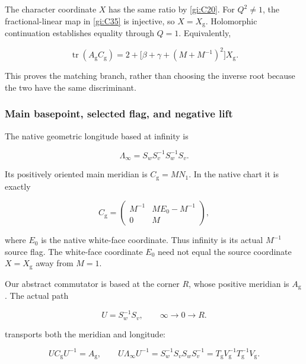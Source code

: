 The character coordinate \(X\) has the same ratio by \eqref{gi:C20}. For \(Q^2\ne1\), the fractional-linear map in \eqref{gi:C35} is injective, so \(X=X_{\mathrm g}\). Holomorphic continuation establishes equality through \(Q=1\). Equivalently,

\begin{equation}\label{gi:C36}
\operatorname{tr}(A_{\mathrm g}C_{\mathrm g})
       =2+\bigl[\beta+\gamma+(M+M^{-1})^2\bigr]X_{\mathrm g}.
\end{equation}

This proves the matching branch, rather than choosing the inverse root because the two have the same discriminant.

\subsubsection{Main basepoint, selected flag, and negative lift}\label{gi:main-basepoint-selected-flag-and-negative-lift}

The native geometric longitude based at infinity is

\begin{equation}\label{gi:C37}
\Lambda_\infty=S_wS_v^{-1}S_w^{-1}S_v.
\end{equation}

Its positively oriented main meridian is \(C_{\mathrm g}=MN_1\). In the native chart it is exactly

\begin{equation}\label{gi:C38}
C_{\mathrm g}=
 \begin{pmatrix}
 M^{-1}&M E_0-M^{-1}\\0&M
 \end{pmatrix},
\end{equation}

where \(E_0\) is the native white-face coordinate. Thus infinity is its actual \(M^{-1}\) source flag. The white-face coordinate \(E_0\) need not equal the source coordinate \(X=X_{\mathrm g}\) away from \(M=1\).

Our abstract commutator is based at the corner \(R\), whose positive meridian is \(A_{\mathrm g}\). The actual path

\begin{equation}\label{gi:C39}
U=S_w^{-1}S_v,\qquad
 \infty\longrightarrow 0\longrightarrow R.
\end{equation}

transports both the meridian and longitude:

\begin{equation}\label{gi:C40}
UC_{\mathrm g}U^{-1}=A_{\mathrm g},\qquad
 U\Lambda_\infty U^{-1}
      =S_w^{-1}S_vS_wS_v^{-1}
      =T_{\mathrm g}V_{\mathrm g}^{-1}
                         T_{\mathrm g}^{-1}V_{\mathrm g}.
\end{equation}

